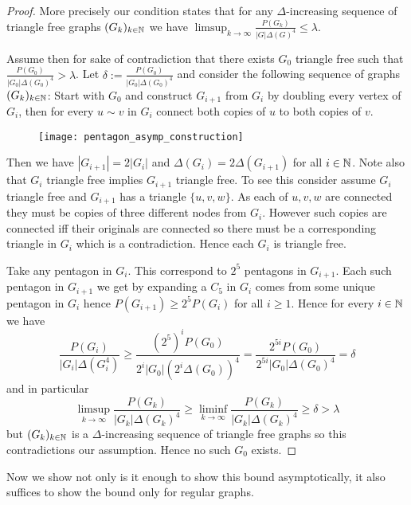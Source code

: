 \begin{proof}
    More precisely our condition states that for any $\Delta$-increasing sequence of
    triangle free graphs $(G_k)_{k\in\mathbb{N}}$ we have
    $\limsup_{k\to\infty} \frac{P(G_k)}{|G|\Delta(G)^4} \leq \lambda$.

    Assume then for sake of contradiction that there exists $G_0$ triangle free
    such that $\frac{P(G_0)}{|G_0|\Delta(G_0)^4} > \lambda$.
    Let $\delta := \frac{P(G_0)}{|G_0|\Delta(G_0)^4}$ and consider the following
    sequence of graphs $(G_k)_{k\in\mathbb{N}}$: Start with $G_0$ and construct
    $G_{i+1}$ from $G_i$ by doubling every vertex of $G_i$, then for every
    $u\sim v$ in $G_i$ connect both copies of $u$ to both copies of $v$.

    \begin{figure}[!ht]
        \centering
        \texttt{[image: pentagon\_asymp\_construction]}
    \end{figure}

    Then we have $|G_{i+1}| = 2|G_i|$ and $\Delta(G_i) = 2\Delta(G_{i+1})$ for all
    $i\in\mathbb{N}$. Note also that $G_i$ triangle free implies $G_{i+1}$ triangle free.
    To see this consider assume $G_i$ triangle free and $G_{i+1}$ has a triangle
    $\{u, v, w\}$. As each of $u,v,w$ are connected they must be copies of three
    different nodes from $G_i$. However such copies are connected iff their originals are
    connected so there must be a corresponding triangle in $G_i$ which is a contradiction.
    Hence each $G_i$ is triangle free.

    Take any pentagon in $G_i$. This correspond to $2^5$ pentagons in $G_{i+1}$. Each
    such pentagon in $G_{i+1}$ we get by expanding a $C_5$ in $G_i$ comes from
    some unique pentagon in $G_i$ hence $P(G_{i+1}) \geq 2^5P(G_i)$ for all $i\geq 1$.
    Hence for every $i\in\mathbb{N}$ we have
    \[
        \frac{P(G_i)}{|G_i|\Delta(G_i^4)} \geq
        \frac{(2^5)^i P(G_0)}{2^i|G_0|(2^i\Delta(G_0))^4}
        = \frac{2^{5i} P(G_0)}{2^{5i}|G_0|\Delta(G_0)^4}
        = \delta
    \]
    and in particular
    \[
        \limsup_{k\to\infty}\frac{P(G_k)}{|G_k|\Delta(G_k)^4} \geq
        \liminf_{k\to\infty}\frac{P(G_k)}{|G_k|\Delta(G_k)^4}
        \geq \delta > \lambda
    \]
    but $(G_k)_{k\in\mathbb{N}}$ is a $\Delta$-increasing sequence of triangle free graphs
    so this contradictions our assumption. Hence no such $G_0$ exists.
\end{proof}

Now we show not only is it enough to show this bound asymptotically, it also suffices
to show the bound only for regular graphs.

